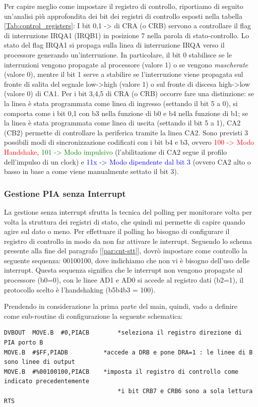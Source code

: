 Per capire meglio come impostare il registro di controllo, riportiamo di seguito un'analisi più approfondita dei bit dei registri di controllo esposti nella tabella \ref{Tab:control_registers}:
I bit 0,1 -> di CRA (o CRB) servono a controllare il flag di interruzione IRQA1 (IRQB1) in posizione 7 nella parola di stato-controllo. Lo stato del flag IRQA1 si propaga sulla linea di interruzione IRQA verso il processore generando un'interruzione. In particolare, il bit 0 stabilisce se le interruzioni vengono propagate al processore (valore 1) o se vengono \textit{mascherate} (valore 0), mentre il bit 1 serve a stabilire se l'interruzione viene propagata sul fronte di salita del segnale low->high (valore 1) o sul fronte di discesa high->low (valore 0) di CA1.
Per i bit 3,4,5 di CRA (o CRB) occorre fare una distinzione: se la linea è stata programmata come linea di ingresso (settando il bit 5 a 0), si comporta come i bit 0,1 con b3 nella funzione di b0 e b4 nella funzione di b1; se la linea è stata programmata come linea di uscita (settando il bit 5 a 1), CA2 (CB2) permette di controllare la periferica tramite la linea CA2. Sono previsti 3 possibili modi di sincronizzazione codificati con i bit b4 e b3, ovvero \textcolor{red}{100 -> Modo Handshake}, \textcolor{green}{101 -> Modo impulsivo} (l'abilitazione di CA2 segue il profilo dell'impulso di un clock) e \textcolor{blue}{11x -> Modo dipendente dal bit 3} (ovvero CA2 alto o basso in base a come viene manualmente settato il bit 3).  



\subsubsection{Gestione PIA senza Interrupt}\label{par:PIA-INT}
La gestione senza interrupt sfrutta la tecnica del polling per monitorare volta per volta la struttura dei registri di stato, che quindi mi permette di capire quando agire sul dato o meno. Per effettuare il polling ho bisogno di configurare il registro di controllo in modo da non far attivare le interrupt.
Seguendo lo schema presente alla fine del paragrafo [\ref{par:cnt-stt}], dovrò impostare come controllo la seguente sequenza: 00100100, dove indichiamo che non vi è bisogno dell'uso delle interrupt. Questa sequenza significa che le interrupt non vengono propagate al processore (b0=0), con le linee AD1 e AD0 si accede al registro dati (b2=1), il protocollo scelto è l'handshaking (b5b4b3 = 100).

Prendendo in considerazione la prima parte del main, quindi, vado a definire come sub-routine di configurazione la seguente schematica:
\begin{lstlisting}
DVBOUT	MOVE.B	#0,PIACB		*seleziona il registro direzione di PIA porto B 
MOVE.B	#$FF,PIADB	  		*accede a DRB e pone DRA=1 : le linee di B sono linee di output	
MOVE.B	#%00100100,PIACB   	*imposta il registro di controllo come indicato precedentemente
								*i bit CRB7 e CRB6 sono a sola lettura	
RTS
\end{lstlisting}

